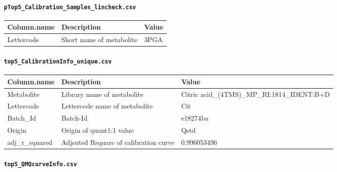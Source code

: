 \documentclass[]{book}
\let\oldparagraph\paragraph
\renewcommand{\paragraph}[1]{\oldparagraph{#1}\mbox{}}
\begin{document}
\hypertarget{ptop5_calibration_samples_lincheck.csv}{%
\paragraph{\texorpdfstring{\texttt{pTop5\_Calibration\_Samples\_lincheck.csv}}{pTop5\_Calibration\_Samples\_lincheck.csv}}\label{ptop5_calibration_samples_lincheck.csv}}

\begin{tabu} to 
\toprule
Column.name & Description & Value\\
\midrule
{}  Lettercode & Short name of metabolite & 3PGA\\
\bottomrule
\end{tabu}

\hypertarget{top5_calibrationinfo_unique.csv}{%
\paragraph{\texorpdfstring{\texttt{top5\_CalibrationInfo\_unique.csv}}{top5\_CalibrationInfo\_unique.csv}}\label{top5_calibrationinfo_unique.csv}}

\begin{tabu} to 
\toprule
Column.name & Description & Value\\
\midrule
{}  Metabolite & Library name of metabolite & Citric acid\_(4TMS)\_MP\_RI:1814\_IDENT:B+D\\
Lettercode & Lettercode name of metabolite & Cit\\
  Batch\_Id & Batch-Id & e18274ba\\
Origin & Origin of quant1:1 value & Qstd\\
  adj\_r\_squared & Adjsuted Rsquare of calibration curve & 0.996053496\\
\bottomrule
\end{tabu}

\hypertarget{top5_qmqcurveinfo.csv}{%
\paragraph{\texorpdfstring{\texttt{top5\_QMQcurveInfo.csv}}{top5\_QMQcurveInfo.csv}}\label{top5_qmqcurveinfo.csv}}
\end{document}
